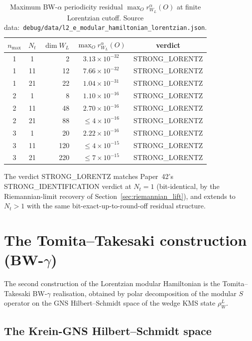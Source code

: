 \documentclass[11pt,a4paper]{article}
\theoremstyle{plain}
\theoremstyle{definition}
\newcommand{\nmax}{n_{\max}}
\newcommand{\Nt}{N_t}
\begin{document}
\begin{table}[ht]
\centering
\caption{Maximum BW-$\alpha$ periodicity residual
$\max_O r_{W_L}^\alpha(O)$ at finite Lorentzian cutoff. Source data:\
\texttt{debug/data/l2\_e\_modular\_hamiltonian\_lorentzian.json}.}
\label{tab:bw_alpha_lorentz_residuals}
\begin{tabular}{ccrcc}
\toprule
$\nmax$ & $\Nt$ & $\dim W_L$ &
$\max_O r_{W_L}^\alpha(O)$ & verdict\\
\midrule
1 & 1  & 2   & $3.13 \times 10^{-32}$ & STRONG\_LORENTZ \\
1 & 11 & 12  & $7.66 \times 10^{-32}$ & STRONG\_LORENTZ \\
1 & 21 & 22  & $1.04 \times 10^{-31}$ & STRONG\_LORENTZ \\
2 & 1  & 8   & $1.10 \times 10^{-16}$ & STRONG\_LORENTZ \\
2 & 11 & 48  & $2.70 \times 10^{-16}$ & STRONG\_LORENTZ \\
2 & 21 & 88  & $\le 4 \times 10^{-16}$ & STRONG\_LORENTZ \\
3 & 1  & 20  & $2.22 \times 10^{-16}$ & STRONG\_LORENTZ \\
3 & 11 & 120 & $\le 4 \times 10^{-15}$ & STRONG\_LORENTZ \\
3 & 21 & 220 & $\le 7 \times 10^{-15}$ & STRONG\_LORENTZ \\
\bottomrule
\end{tabular}
\end{table}

The verdict STRONG\_LORENTZ matches Paper~42's STRONG\_IDENTIFICATION
verdict at $\Nt = 1$ (bit-identical, by the Riemannian-limit recovery
of Section~\ref{sec:riemannian_lift}), and extends to $\Nt > 1$ with
the same bit-exact-up-to-round-off residual structure.

\section{The Tomita--Takesaki construction (BW-$\gamma$)}\label{sec:bw_gamma}

The second construction of the Lorentzian modular Hamiltonian is the
Tomita--Takesaki BW-$\gamma$ realisation, obtained by polar
decomposition of the modular $S$ operator on the GNS Hilbert--Schmidt
space of the wedge KMS state $\rho_W^L$.

\subsection{The Krein-GNS Hilbert--Schmidt space}\label{sec:krein_gns}
\end{document}
